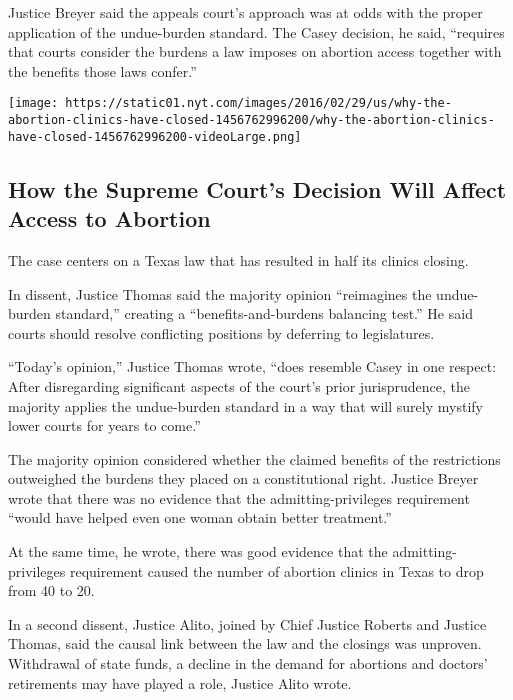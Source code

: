 Justice Breyer said the appeals court's approach was at odds with the
proper application of the undue-burden standard. The Casey decision, he
said, ``requires that courts consider the burdens a law imposes on
abortion access together with the benefits those laws confer.''

\href{https://www.nytimes.com/interactive/2016/02/29/us/why-the-abortion-clinics-have-closed.html}{}

\texttt{[image: https://static01.nyt.com/images/2016/02/29/us/why-the-abortion-clinics-have-closed-1456762996200/why-the-abortion-clinics-have-closed-1456762996200-videoLarge.png]}

\hypertarget{how-the-supreme-courts-decision-will-affect-access-to-abortion}{%
\subsection{How the Supreme Court's Decision Will Affect Access to
Abortion}\label{how-the-supreme-courts-decision-will-affect-access-to-abortion}}

The case centers on a Texas law that has resulted in half its clinics
closing.

In dissent, Justice Thomas said the majority opinion ``reimagines the
undue-burden standard,'' creating a ``benefits-and-burdens balancing
test.'' He said courts should resolve conflicting positions by deferring
to legislatures.

``Today's opinion,'' Justice Thomas wrote, ``does resemble Casey in one
respect: After disregarding significant aspects of the court's prior
jurisprudence, the majority applies the undue-burden standard in a way
that will surely mystify lower courts for years to come.''

The majority opinion considered whether the claimed benefits of the
restrictions outweighed the burdens they placed on a constitutional
right. Justice Breyer wrote that there was no evidence that the
admitting-privileges requirement ``would have helped even one woman
obtain better treatment.''

At the same time, he wrote, there was good evidence that the
admitting-privileges requirement caused the number of abortion clinics
in Texas to drop from 40 to 20.

In a second dissent, Justice Alito, joined by Chief Justice Roberts and
Justice Thomas, said the causal link between the law and the closings
was unproven. Withdrawal of state funds, a decline in the demand for
abortions and doctors' retirements may have played a role, Justice Alito
wrote.

